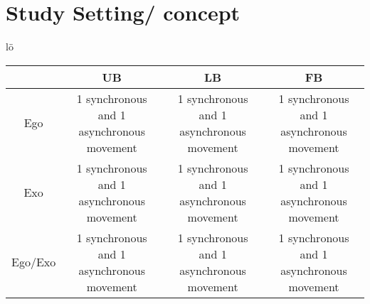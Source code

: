 \chapter{Study Setting/ concept}
lö
\begin{center}
	\begin{tabular}{ | c | c | c | c | }
		\hline
		 & UB & LB & FB \\ \hline 
		Ego & \parbox{4cm}{1 synchronous and 1 asynchronous movement} & \parbox{4cm}{1 synchronous and 1 asynchronous movement} & \parbox{4cm}{1 synchronous and 1 asynchronous movement} \\ \hline 
		Exo & \parbox{4cm}{1 synchronous and 1 asynchronous movement} & \parbox{4cm}{1 synchronous and 1 asynchronous movement} & \parbox{4cm}{1 synchronous and 1 asynchronous movement} \\ \hline
		Ego/Exo & \parbox{4cm}{1 synchronous and 1 asynchronous movement} & \parbox{4cm}{1 synchronous and 1 asynchronous movement} & \parbox{4cm}{1 synchronous and 1 asynchronous movement} \\
		\hline
	\end{tabular}
\end{center}
